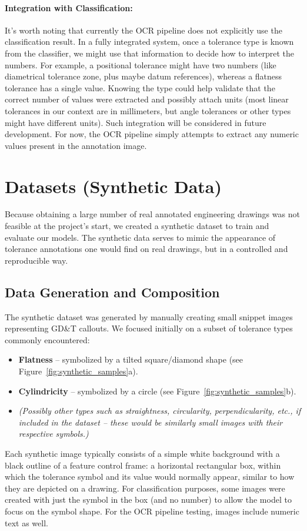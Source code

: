 \documentclass[11pt,a4paper]{article}
\begin{document}
\paragraph{Integration with Classification:} It’s worth noting that currently the OCR pipeline does not explicitly use the classification result. In a fully integrated system, once a tolerance type is known from the classifier, we might use that information to decide how to interpret the numbers. For example, a positional tolerance might have two numbers (like diametrical tolerance zone, plus maybe datum references), whereas a flatness tolerance has a single value. Knowing the type could help validate that the correct number of values were extracted and possibly attach units (most linear tolerances in our context are in millimeters, but angle tolerances or other types might have different units). Such integration will be considered in future development. For now, the OCR pipeline simply attempts to extract any numeric values present in the annotation image.

\section{Datasets (Synthetic Data)}
Because obtaining a large number of real annotated engineering drawings was not feasible at the project’s start, we created a synthetic dataset to train and evaluate our models. The synthetic data serves to mimic the appearance of tolerance annotations one would find on real drawings, but in a controlled and reproducible way.

\subsection*{Data Generation and Composition}
The synthetic dataset was generated by manually creating small snippet images representing GD\&T callouts. We focused initially on a subset of tolerance types commonly encountered:
\begin{itemize}
  \item \textbf{Flatness} – symbolized by a tilted square/diamond shape (see Figure~\ref{fig:synthetic_samples}a).
  \item \textbf{Cylindricity} – symbolized by a circle (see Figure~\ref{fig:synthetic_samples}b).
  \item \textit{(Possibly other types such as straightness, circularity, perpendicularity, etc., if included in the dataset – these would be similarly small images with their respective symbols.)}
\end{itemize}
Each synthetic image typically consists of a simple white background with a black outline of a feature control frame: a horizontal rectangular box, within which the tolerance symbol and its value would normally appear, similar to how they are depicted on a drawing. For classification purposes, some images were created with just the symbol in the box (and no number) to allow the model to focus on the symbol shape. For the OCR pipeline testing, images include numeric text as well.
\end{document}
